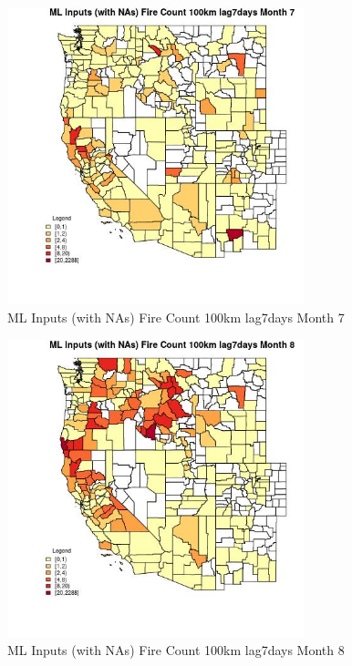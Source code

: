 \begin{figure} 
\centering  
\includegraphics[width=0.77\textwidth]{Code_Outputs/Report_ML_input_PM25_Step4_part_e_de_duplicated_aves_compiled_2019-05-20wNAs_CountyFire_Count_100km_lag7daysmedianMonth7.jpg} 
\caption{\label{fig:Report_ML_input_PM25_Step4_part_e_de_duplicated_aves_compiled_2019-05-20wNAsCountyFire_Count_100km_lag7daysmedianMonth7}ML Inputs (with NAs) Fire Count 100km lag7days Month 7} 
\end{figure} 
 

\begin{figure} 
\centering  
\includegraphics[width=0.77\textwidth]{Code_Outputs/Report_ML_input_PM25_Step4_part_e_de_duplicated_aves_compiled_2019-05-20wNAs_CountyFire_Count_100km_lag7daysmedianMonth8.jpg} 
\caption{\label{fig:Report_ML_input_PM25_Step4_part_e_de_duplicated_aves_compiled_2019-05-20wNAsCountyFire_Count_100km_lag7daysmedianMonth8}ML Inputs (with NAs) Fire Count 100km lag7days Month 8} 
\end{figure} 
 

